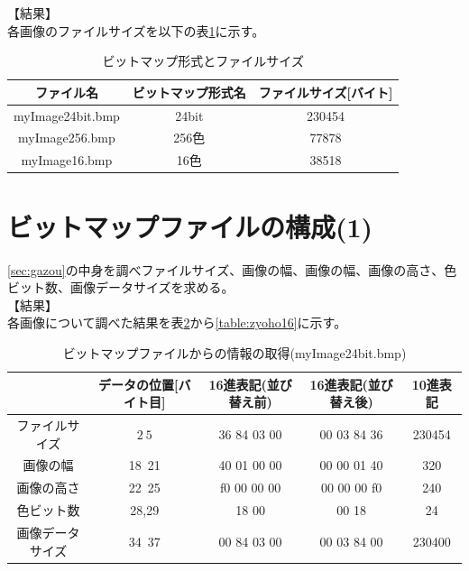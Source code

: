 \documentclass[uplatex, titlepage]{jsarticle}
\begin{document}
【結果】\\

  各画像のファイルサイズを以下の表\ref{table:bitfile}に示す。

\begin{table}[H]
  \centering
  \caption{ビットマップ形式とファイルサイズ}
  \label{table:bitfile}
  \begin{tabular}{|c|c|c|}\hline
    ファイル名 & ビットマップ形式名 & ファイルサイズ[バイト] \\ \hline
    myImage24bit.bmp & 24bit & 230454 \\ \hline
    myImage256.bmp & 256色 & 77878 \\ \hline
    myImage16.bmp & 16色 & 38518 \\ \hline
  \end{tabular}
\end{table}

\section{ビットマップファイルの構成(1)}

  \ref{sec:gazou}の中身を調べファイルサイズ、画像の幅、画像の幅、画像の高さ、色ビット数、画像データサイズを求める。\\

【結果】\\

  各画像について調べた結果を表\ref{table:zyoho24}から\ref{table:zyoho16}に示す。\\

\begin{table}[H]
  \centering
  \caption{ビットマップファイルからの情報の取得(myImage24bit.bmp)}
  \label{table:zyoho24}
  \begin{tabular}{|c|c|c|c|c|}\hline
     & データの位置[バイト目] & 16進表記(並び替え前) & 16進表記(並び替え後) & 10進表記 \\ \hline
     ファイルサイズ & $2~5$ & 36 84 03 00 & 00 03 84 36 & 230454 \\ \hline
     画像の幅 & 18~21 & 40 01 00 00 & 00 00 01 40 & 320 \\ \hline
     画像の高さ & 22~25 & f0 00 00 00 & 00 00 00 f0 & 240 \\ \hline
     色ビット数 & 28,29 & 18 00 & 00 18 & 24 \\ \hline
     画像データサイズ & 34~37 & 00 84 03 00 & 00 03 84 00 & 230400 \\ \hline
  \end{tabular}
\end{table}
\end{document}
